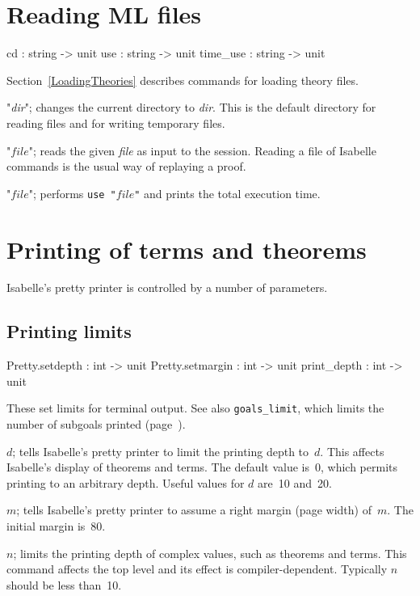 \section{Reading ML files}
\begin{ttbox} 
cd              : string -> unit
use             : string -> unit
time_use        : string -> unit
\end{ttbox}
Section~\ref{LoadingTheories} describes commands for loading theory files.
\begin{ttdescription}
\item[\ttindexbold{cd} "{\it dir}";]
  changes the current directory to {\it dir}.  This is the default directory
  for reading files and for writing temporary files.

\item[\ttindexbold{use} "$file$";]  
reads the given {\it file} as input to the \ML{} session.  Reading a file
of Isabelle commands is the usual way of replaying a proof.

\item[\ttindexbold{time_use} "$file$";]  
performs {\tt use~"$file$"} and prints the total execution time.
\end{ttdescription}


\section{Printing of terms and theorems}\label{sec:printing-control}
Isabelle's pretty printer is controlled by a number of parameters.

\subsection{Printing limits}
\begin{ttbox} 
Pretty.setdepth  : int -> unit
Pretty.setmargin : int -> unit
print_depth      : int -> unit
\end{ttbox}
These set limits for terminal output.  See also {\tt goals_limit}, which
limits the number of subgoals printed (page~\pageref{sec:goals-printing}).

\begin{ttdescription}
\item[\ttindexbold{Pretty.setdepth} \(d\);]  
  tells Isabelle's pretty printer to limit the printing depth to~$d$.  This
  affects Isabelle's display of theorems and terms.  The default value
  is~0, which permits printing to an arbitrary depth.  Useful values for
  $d$ are~10 and~20.

\item[\ttindexbold{Pretty.setmargin} \(m\);]  
  tells Isabelle's pretty printer to assume a right margin (page width)
  of~$m$.  The initial margin is~80.

\item[\ttindexbold{print_depth} \(n\);]  
  limits the printing depth of complex \ML{} values, such as theorems and
  terms.  This command affects the \ML{} top level and its effect is
  compiler-dependent.  Typically $n$ should be less than~10.
\end{ttdescription}


